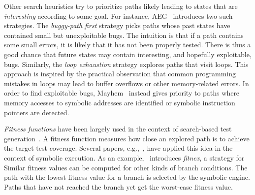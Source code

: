 Other search heuristics try to prioritize paths likely leading to states that are {\em interesting} according to some goal. For instance, {\sc AEG}~\cite{AEG-NDSS11} introduces two such strategies. The {\em buggy-path first} strategy picks paths whose past states have contained small but unexploitable bugs. The intuition is that if a path contains some small errors, it is likely that it has not been properly tested. There is thus a good chance that future states may contain interesting, and hopefully exploitable, bugs. Similarly, the {\em loop exhaustion} strategy explores paths that visit loops. This approach is inspired by the practical observation that common programming mistakes in loops may lead to buffer overflows or other memory-related errors. In order to find exploitable bugs, {\sc Mayhem}~\cite{MAYHEM-SP12} instead gives priority to paths where memory accesses to symbolic addresses are identified or symbolic instruction pointers are detected. 


{\em Fitness functions} have been largely used in the context of search-based test generation~\cite{M-STVR04}. %
A fitness function measures how close an explored path is to achieve the target test coverage. Several papers, e.g.,~\cite{XTD-DSN09,CS-CACM13}, have applied this idea in the context of symbolic execution. As an example,~\cite{XTD-DSN09} introduces {\em fitnex}, a strategy for  Similar fitness values can be computed for other kinds of branch conditions. The path with the lowest fitness value for a branch is selected by the symbolic engine. Paths that have not reached the branch yet get the worst-case fitness value. 

